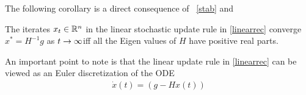 The following corollary is a direct consequence of ~\ref{stab} and 
\begin{corollary}\label{linstab}
The iterates $x_t\in \mathbb{R}^n$ in the linear stochastic update rule in \eqref{linearrec} converge $x^*=H^{-1}g$ as $t\rightarrow\infty $iff all the Eigen values of $H$ have positive real parts.
\end{corollary}
An important point to note is that the linear update rule in \eqref{linearrec} can be viewed as an Euler discretization of the ODE 
\begin{align}\label{linearode}\dot{x}(t)=(g-Hx(t))\end{align}
